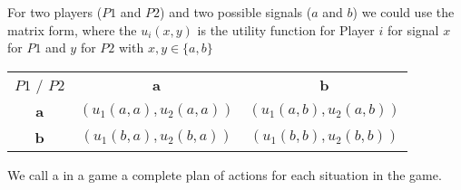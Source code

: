 For two players ($P1$ and $P2$) and two possible signals ($a$ and $b$) we could use the matrix form, where the $u_{i}(x, y)$ is the utility function for Player $i$ for signal $x$ for $P1$ and $y$ for $P2$ with $x, y \in \{ a, b\}$
\begin{center}
	\begin{tabular}{|c|c|c|}
		\hline\hline
  			$P1$ / $P2$ & \textbf{a} & \textbf{b} \\
         		\cline{1-3}
   					\textbf{a} & $( u_{1}(a, a) , u_{2}(a, a))$ & $(u_{1}(a, b), u_{2}(a, b))$	\arrayrulewidth2pt \\
            	\cline{1-3}
   					\textbf{b} & $( u_{1}(b, a), u_{2}(b, a))$ & $(u_{1}(b, b), u_{2}(b, b))$\\ \hline\hline
	\end{tabular}	
\end{center}

We call a  in a game a complete plan of actions for each situation in the game.

